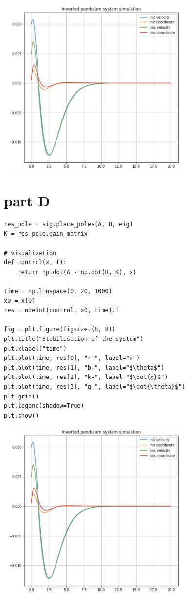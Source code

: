\documentclass[a4paper,11pt]{article}
\makeatletter
\newcommand{\problemquestion}[1]{\gdef\@problemquestion{#1}}%
\newcommand{\problemsolution}[1]{\gdef\@problemsolution{#1}}%
\theoremstyle{mytheor}
\makeatother
\begin{document}
\includegraphics[width=10cm, height=9cm]{C.png}

\section*{part D}
\begin{problem}
  \problemquestion{design state feedback controller for linearized system}
  \problemsolution{}
\end{problem}
\begin{lstlisting}[label={list:second}]
res_pole = sig.place_poles(A, B, eig)
K = res_pole.gain_matrix

# visualization
def control(x, t):
    return np.dot(A - np.dot(B, K), x)

time = np.linspace(0, 20, 1000)   
x0 = x[0]
res = odeint(control, x0, time).T

fig = plt.figure(figsize=(8, 8))
plt.title("Stabilisation of the system")
plt.xlabel("time")
plt.plot(time, res[0], "r-", label="x")
plt.plot(time, res[1], "b-", label="$\theta$")
plt.plot(time, res[2], "k-", label="$\dot{x}$")
plt.plot(time, res[3], "g-", label="$\dot{\theta}$")
plt.grid()
plt.legend(shadow=True)
plt.show()
\end{lstlisting}{}

\includegraphics[width=10cm, height=9cm]{C.png}
\end{document}
